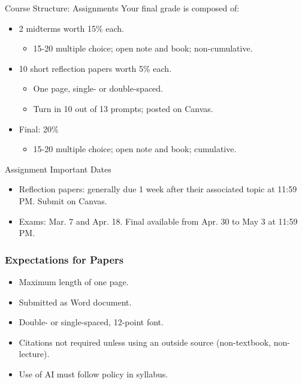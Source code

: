 \documentclass{beamer}
\begin{document}
\begin{frame}{\LARGE Course Structure: Assignments}
	Your final grade is composed of: 
	\begin{itemize}
		\item 2 midterms worth 15\% each.
		\begin{itemize}
			\item 15-20 multiple choice; open note and book; non-cumulative.
		\end{itemize}
		\item 10 short reflection papers worth 5\% each.
		\begin{itemize}
			\item One page, single- or double-spaced.
			\item Turn in 10 out of 13 prompts; posted on Canvas.
		\end{itemize}
		\item Final: 20\%
		\begin{itemize}
			\item 15-20 multiple choice; open note and book; cumulative.
		\end{itemize}
	\end{itemize}
\end{frame}


\begin{frame}{\LARGE Assignment Important Dates}
	\begin{itemize}
		\item Reflection papers: generally due 1 week after their associated topic at 11:59 PM. Submit on Canvas.
		\item Exams: Mar. 7 and Apr. 18. Final available from Apr. 30 to May 3 at 11:59 PM. 
	\end{itemize}
\end{frame}

\begin{frame} 
	\frametitle{\LARGE{Expectations for Papers}}
	\begin{itemize}
		\item Maximum length of one page.
		\item Submitted as Word document.
		\item Double- or single-spaced, 12-point font.
		\item Citations not required unless using an outside source (non-textbook, non-lecture).
		\item Use of AI must follow policy in syllabus.
	\end{itemize}
\end{frame}
\end{document}
